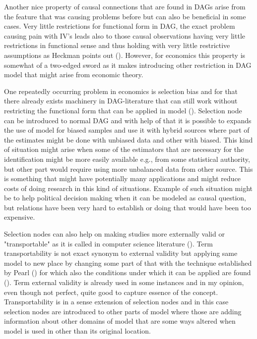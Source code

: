 \documentclass[main=english,12pt,a4paper,pdftex,econ,utf8]{aaltothesis}
\begin{document}
Another nice property of causal connections that are found in DAGs arise from the feature that was causing problems before but can also be beneficial in some cases. Very little restrictions for functional form in DAG, the exact problem causing pain with IV's leads also to those causal observations having very little restrictions in functional sense and thus holding with very little restrictive assumptions as Heckman points out (\cite{Heckman2015}). However, for economics this property is somewhat of a two-edged sword as it makes introducing other restriction in DAG model that might arise from economic theory.

One repeatedly occurring problem in economics is selection bias and for that there already exists machinery in DAG-literature that can still work without restricting the functional form that can be applied in model (\cite{Bareinboim2014}). Selection node can be introduced to normal DAG and with help of that it is possible to expands the use of model for biased samples and use it with hybrid sources where part of the estimates might be done with unbiased data and other with biased. This kind of situation might arise when some of the estimators that are necessary for the identification might be more easily available e.g., from some statistical authority, but other part would require using more unbalanced data from other source. This is something that might have potentially many applications and might reduce costs of doing research in this kind of situations. Example of such situation might be to help political decision making when it can be modeled as causal question, but relations have been very hard to establish or doing that would have been too expensive.

Selection nodes can also help on making studies more externally valid or "transportable" as it is called in computer science literature (\cite{Pearl2011}). Term transportability is not exact synonym to external validity but applying same model to new place by changing some part of that with the technique established by Pearl (\cite{Pearl2011}) for which also the conditions under which it can be applied are found (\cite{Bareinboim2012a}). Term external validity is already used in some instances and in my opinion, even though not perfect, quite good to capture essence of the concept. Transportability is in a sense extension of selection nodes and in this case selection nodes are introduced to other parts of model where those are adding information about other domains of model that are some ways altered when model is used in other than its original location. 
\end{document}
